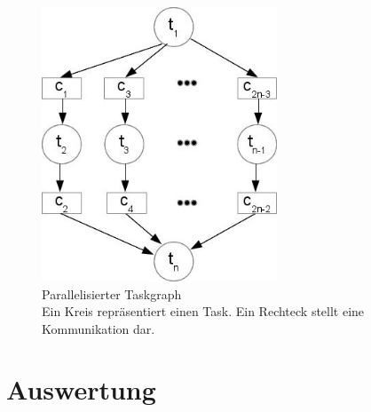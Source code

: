 \begin{figure}[H]\centering
  \includegraphics[width = 70mm]{bilder/parallel.jpg}
  \caption{Parallelisierter Taskgraph\\ Ein Kreis repräsentiert einen Task. Ein Rechteck stellt eine Kommunikation dar.}\label{fig:par}
\end{figure}

\section{Auswertung} \label{Auswertung} 


